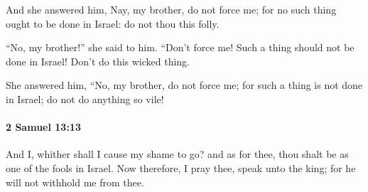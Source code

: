 			\begin{versebox}
					\item[BHS] 
					\item[ASV] And she answered him, Nay, my brother, do not force me; for no such thing ought to be done in Israel: do not thou this folly.
					\item[NIV] “No, my brother!” she said to him. “Don’t force me! Such a thing should not be done in Israel! Don’t do this wicked thing.
					\item[NRSV] She answered him, “No, my brother, do not force me; for such a thing is not done in Israel; do not do anything so vile!
			\end{versebox}

		\paragraph{2 Samuel 13:13} %
			\label{2SAMUEL-13-13}

			And I, whither shall I cause my shame to go? and as for thee, thou shalt be as one of the fools in Israel. Now therefore, I pray thee, speak unto the king; for he will not withhold me from thee.

